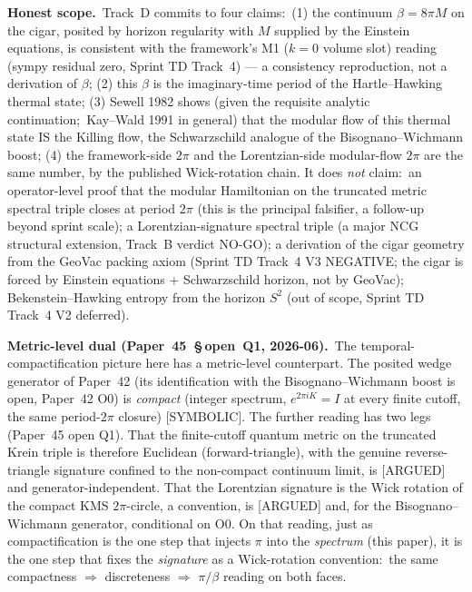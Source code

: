 \documentclass[11pt]{article}
\begin{document}
\textbf{Honest scope.}\ Track~D commits to four claims:\ (1) the
continuum $\beta = 8\pi M$ on the cigar, posited by horizon regularity
with $M$ supplied by the Einstein equations, is consistent with the
framework's M1 ($k = 0$ volume slot) reading (sympy residual zero,
Sprint TD Track~4) --- a consistency reproduction, not a derivation of
$\beta$; (2) this $\beta$ is the
imaginary-time period of the Hartle--Hawking thermal state; (3) Sewell
1982 shows (given the requisite analytic continuation;\ Kay--Wald 1991
in general) that the modular flow of this thermal state IS the Killing
flow, the Schwarzschild analogue of the Bisognano--Wichmann boost;
(4) the framework-side $2\pi$ and the Lorentzian-side modular-flow
$2\pi$ are the same number, by the published Wick-rotation chain.  It
does \emph{not} claim:\ an operator-level proof that the modular
Hamiltonian on the truncated metric spectral triple closes at period
$2\pi$ (this is the principal falsifier, a follow-up beyond sprint
scale); a
Lorentzian-signature spectral triple (a major NCG structural
extension, Track~B
verdict NO-GO); a
derivation of the cigar geometry from the GeoVac packing axiom (Sprint
TD Track~4 V3 NEGATIVE; the cigar is forced by Einstein equations +
Schwarzschild horizon, not by GeoVac); Bekenstein--Hawking entropy
from the horizon $S^2$ (out of scope, Sprint TD Track~4 V2 deferred).

\textbf{Metric-level dual (Paper~45~§\,open~Q1, 2026-06).}\ The
temporal-compactification picture here has a metric-level counterpart.
The posited wedge generator of Paper~42 (its identification with
the Bisognano--Wichmann boost is open, Paper~42 O0) is \emph{compact}
(integer spectrum, $e^{2\pi i K} = I$ at every finite cutoff, the same
period-$2\pi$ closure) [SYMBOLIC].  The further reading has two legs
(Paper~45 open Q1).  That the finite-cutoff quantum metric on the
truncated Krein triple is therefore Euclidean (forward-triangle), with
the genuine reverse-triangle signature confined to the non-compact
continuum limit, is [ARGUED] and generator-independent.  That the
Lorentzian signature is the Wick rotation of the compact KMS
$2\pi$-circle, a convention, is [ARGUED] and, for the
Bisognano--Wichmann generator, conditional on O0. On that reading,
just as compactification is the one step that injects $\pi$ into the
\emph{spectrum} (this paper), it is the one step that fixes the
\emph{signature} as a Wick-rotation convention:\ the same compactness
$\Rightarrow$ discreteness $\Rightarrow$ $\pi/\beta$ reading on both
faces.
\end{document}
